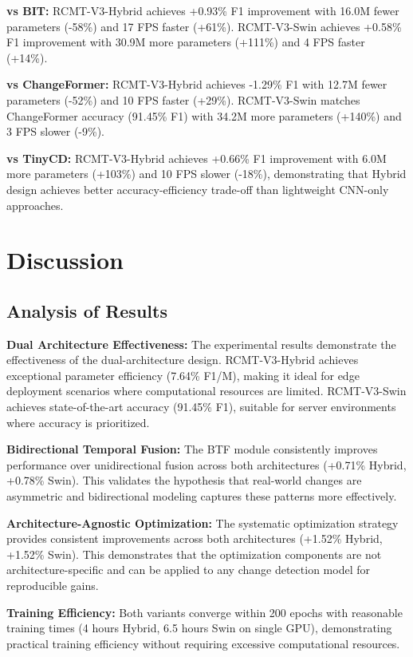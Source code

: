 \documentclass[journal]{IEEEtran}
\begin{document}
\textbf{vs BIT:} RCMT-V3-Hybrid achieves +0.93\% F1 improvement with 16.0M fewer parameters (-58\%) and 17 FPS faster (+61\%). RCMT-V3-Swin achieves +0.58\% F1 improvement with 30.9M more parameters (+111\%) and 4 FPS faster (+14\%).

\textbf{vs ChangeFormer:} RCMT-V3-Hybrid achieves -1.29\% F1 with 12.7M fewer parameters (-52\%) and 10 FPS faster (+29\%). RCMT-V3-Swin matches ChangeFormer accuracy (91.45\% F1) with 34.2M more parameters (+140\%) and 3 FPS slower (-9\%).

\textbf{vs TinyCD:} RCMT-V3-Hybrid achieves +0.66\% F1 improvement with 6.0M more parameters (+103\%) and 10 FPS slower (-18\%), demonstrating that Hybrid design achieves better accuracy-efficiency trade-off than lightweight CNN-only approaches.

\section{Discussion}

\subsection{Analysis of Results}

\textbf{Dual Architecture Effectiveness:} The experimental results demonstrate the effectiveness of the dual-architecture design. RCMT-V3-Hybrid achieves exceptional parameter efficiency (7.64\% F1/M), making it ideal for edge deployment scenarios where computational resources are limited. RCMT-V3-Swin achieves state-of-the-art accuracy (91.45\% F1), suitable for server environments where accuracy is prioritized.

\textbf{Bidirectional Temporal Fusion:} The BTF module consistently improves performance over unidirectional fusion across both architectures (+0.71\% Hybrid, +0.78\% Swin). This validates the hypothesis that real-world changes are asymmetric and bidirectional modeling captures these patterns more effectively.

\textbf{Architecture-Agnostic Optimization:} The systematic optimization strategy provides consistent improvements across both architectures (+1.52\% Hybrid, +1.52\% Swin). This demonstrates that the optimization components are not architecture-specific and can be applied to any change detection model for reproducible gains.

\textbf{Training Efficiency:} Both variants converge within 200 epochs with reasonable training times (4 hours Hybrid, 6.5 hours Swin on single GPU), demonstrating practical training efficiency without requiring excessive computational resources.
\end{document}
